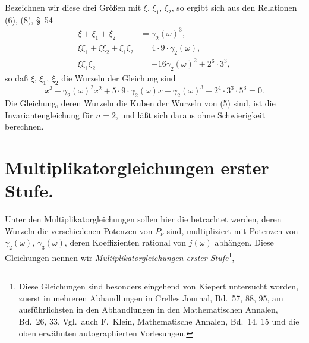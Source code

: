\documentclass[12pt,a4paper]{article}
\theoremstyle{definition}
\begin{document}
Bezeichnen wir diese drei Größen mit $\xi$, $\xi_1$, $\xi_2$, so ergibt sich aus den Relationen (6), (8), \S\ 54
\[
\begin{aligned}
\xi + \xi_1 + \xi_2 &= \gamma_2(\omega)^3, \\
\xi\xi_1 + \xi\xi_2 + \xi_1\xi_2 &= 4 \cdot 9 \cdot \gamma_2(\omega), \\
\xi\xi_1\xi_2 &= -16 \gamma_2(\omega)^2 + 2^6 \cdot 3^3,
\end{aligned}
\]
so daß $\xi$, $\xi_1$, $\xi_2$ die Wurzeln der Gleichung sind
\begin{equation}\label{eq:71-5}
x^3 - \gamma_2(\omega)^2 x^2 + 5 \cdot 9 \cdot \gamma_2(\omega) x + \gamma_2(\omega)^3 - 2^4 \cdot 3^3 \cdot 5^3 = 0.
\end{equation}
Die Gleichung, deren Wurzeln die Kuben der Wurzeln von (5) sind, ist die Invariantengleichung für $n = 2$, und läßt sich daraus ohne Schwierigkeit berechnen.


\section{Multiplikatorgleichungen erster Stufe.}\label{sec:72}

Unter den Multiplikatorgleichungen sollen hier die betrachtet werden, deren Wurzeln die verschiedenen Potenzen von $P_\nu$ sind, multipliziert mit Potenzen von $\gamma_2(\omega)$, $\gamma_3(\omega)$, deren Koeffizienten rational von $j(\omega)$ abhängen. Diese Gleichungen nennen wir \emph{Multiplikatorgleichungen erster Stufe}{}\footnote{Diese Gleichungen sind besonders eingehend von Kiepert untersucht worden, zuerst in mehreren Abhandlungen in Crelles Journal, Bd.~57, 88, 95, am ausführlichsten in den Abhandlungen in den Mathematischen Annalen, Bd.~26, 33. Vgl.\ auch F.~Klein, Mathematische Annalen, Bd.~14, 15 und die oben erwähnten autographierten Vorlesungen.},
\end{document}
